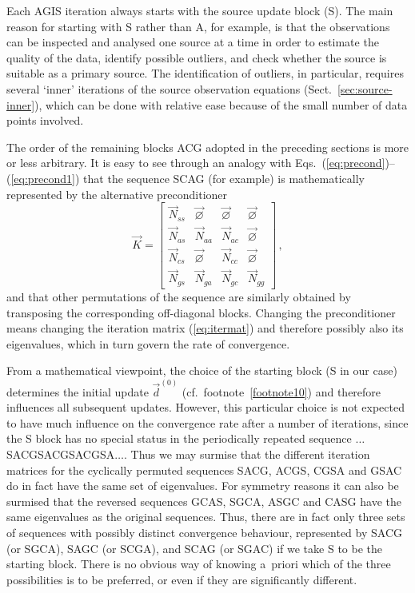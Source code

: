 \documentclass[structabstract]{aa}
\begin{document}
Each AGIS iteration always starts with the source update block (S).
The main reason for starting with S rather than A, for example, is
that the observations can be inspected and analysed one source at a
time in order to estimate the quality of the data, identify possible
outliers, and check whether the source is suitable as a primary source.
The identification of outliers, in particular, requires several
`inner' iterations of the source observation equations
(Sect.~\ref{sec:source-inner}), which can
be done with relative ease because of the small number of data
points involved.

The order of the remaining blocks ACG adopted in the preceding
sections is more or less arbitrary. It is easy to see through an
analogy with Eqs.~(\ref{eq:precond})--(\ref{eq:precond1}) that
the sequence SCAG (for example) is mathematically represented by
the alternative preconditioner
\begin{equation}\label{eq:precondSCAG}
\vec{K} =
    \begin{bmatrix}
        \vec{N}_{ss} & \vec{\varnothing} & \vec{\varnothing} & \vec{\varnothing} \\
        \vec{N}_{as} & \vec{N}_{aa}      & \vec{N}_{ac}      & \vec{\varnothing} \\
        \vec{N}_{cs} & \vec{\varnothing} & \vec{N}_{cc}      & \vec{\varnothing} \\
        \vec{N}_{gs} & \vec{N}_{ga}      & \vec{N}_{gc}      & \vec{N}_{gg}
    \end{bmatrix} \, ,
\end{equation}
and that other permutations of the sequence are similarly obtained by
transposing the corresponding off-diagonal blocks. Changing the
preconditioner means changing the iteration matrix (\ref{eq:itermat})
and therefore possibly also its eigenvalues, which in turn govern the rate of
convergence.

From a mathematical viewpoint, the choice of the starting block
(S in our case) determines the initial update $\vec{d}^{(0)}$
(cf.\ footnote~\ref{footnote10}) and therefore influences all subsequent updates.
However, this particular choice is not expected to have much influence
on the convergence rate after a number of iterations, since the S block
has no special status in the periodically repeated sequence
$\dots$SACGSACGSACGSA$\dots$. Thus we may surmise that the different
iteration matrices for the cyclically permuted sequences SACG, ACGS,
CGSA and GSAC do in fact have the same set of eigenvalues. For symmetry
reasons it can also be surmised that the reversed sequences GCAS, SGCA,
ASGC and CASG have the same eigenvalues as the original sequences. Thus,
there are in fact only three sets of sequences with possibly distinct
convergence behaviour, represented by SACG (or SGCA), SAGC (or SCGA),
and SCAG (or SGAC) if we take S to be the starting block. There is no
obvious way of knowing a~priori which of the three possibilities is
to be preferred, or even if they are significantly different.
\end{document}
